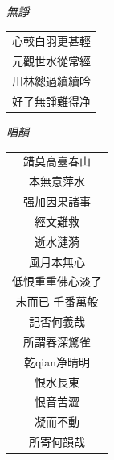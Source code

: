 \documentclass{ctexart}
\begin{document}
	\begin{titlepage}
		\thispagestyle{empty}
		
		\begingroup
		\setlength{\parindent}{0pt}
		\setlength{\parskip}{0pt}
		
		\vspace{3.0cm} 
		
		\begin{center}
			{\large \itshape 無諍}
			\vspace{0.3cm}
			
			\begin{minipage}{\linewidth}
				\centering
				{\large \itshape
					\begin{tabular}{@{}c@{}}
						心較白羽更甚輕\\
						元觀世水從常經\\
						川林總過續續吟\\
						好了無諍難得净
					\end{tabular}
				}
			\end{minipage}
			
		\end{center}
		
		\endgroup
	\end{titlepage}
	
	\begin{titlepage}
		\thispagestyle{empty}
		
		\begingroup
		\setlength{\parindent}{0pt}
		\setlength{\parskip}{0pt}
		
		\vspace{3.0cm} 
		
		\begin{center}
			{\large \itshape 唱韻}
			\vspace{0.3cm}
			
			\begin{minipage}{\linewidth}
				\centering
				{\large \itshape
					\begin{tabular}{@{}c@{}}
						錯莫高臺春山\\
						本無意萍水\\
						强加因果諸事\\
						經文難救\\
						逝水漣漪\\
						風月本無心\\
						低恨重重佛心淡了\\
						未而已 千番萬般\\
						記否何義哉\\
						所謂春深驚雀\\
						乾qian净晴明\\
						恨水長東\\
						恨音苦澀\\
						凝而不動\\
						所寄何韻哉
					\end{tabular}
				}
			\end{minipage}
			
		\end{center}
		
		\endgroup
	\end{titlepage}
	
\end{document}
